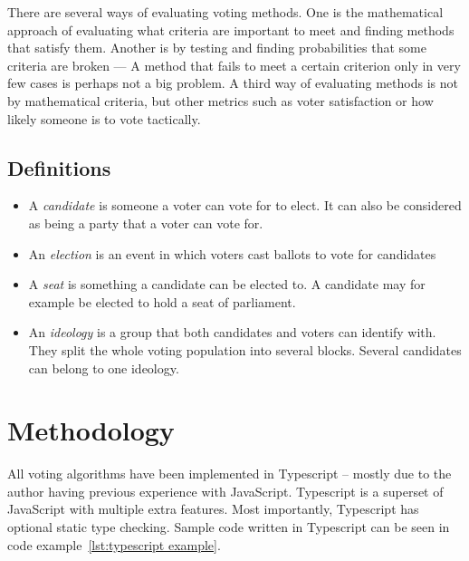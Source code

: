 \documentclass[12pt]{article}
\begin{document}
There are several ways of evaluating voting methods. One is the mathematical approach of evaluating what criteria are important to meet and finding methods that satisfy them. Another is by testing and finding probabilities that some criteria are broken — A method that fails to meet a certain criterion only in very few cases is perhaps not a big problem. A third way of evaluating methods is not by mathematical criteria, but other metrics such as voter satisfaction or how likely someone is to vote tactically.
\subsection{Definitions}
\begin{itemize}
	\item A \textit{candidate} is someone a voter can vote for to elect. It can also be considered as being a party that a voter can vote for.
	\item An \textit{election} is an event in which voters cast ballots to vote for candidates
	\item A \textit{seat} is something a candidate can be elected to. A candidate may for example be elected to hold a seat of parliament.
	\item An \textit{ideology} is a group that both candidates and voters can identify with. They split the whole voting population into several blocks. Several candidates can belong to one ideology.
\end{itemize}  
\pagebreak
\section{Methodology}
All voting algorithms have been implemented in Typescript – mostly due to the author having previous experience with JavaScript. Typescript is a superset of JavaScript with multiple extra features. Most importantly, Typescript has optional static type checking. Sample code written in Typescript can be seen in code example~\ref{lst:typescript example}.
\end{document}
